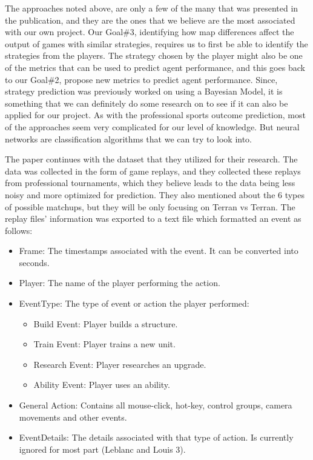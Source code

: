 \documentclass[a4paper,12pt]{report}
\begin{document}
The approaches noted above, are only a few of the many that was presented in the publication, and they are the ones that we believe are the most associated with our own project. Our Goal\#3, identifying how map differences affect the output of games with similar strategies, requires us to first be able to identify the strategies from the players. The strategy chosen by the player might also be one of the metrics that can be used to predict agent performance, and this goes back to our Goal\#2, propose new metrics to predict agent performance. Since, strategy prediction was previously worked on using a Bayesian Model, it is something that we can definitely do some research on to see if it can also be applied for our project. As with the professional sports outcome prediction, most of the approaches seem very complicated for our level of knowledge. But neural networks are classification algorithms that we can try to look into.

The paper continues with the dataset that they utilized for their research. The data was collected in the form of game replays, and they collected these replays from professional tournaments, which they believe leads to the data being less noisy and more optimized for prediction. They also mentioned about the 6 types of possible matchups, but they will be only focusing on Terran vs Terran. The replay files’ information was exported to a text file which formatted an event as follows:

\begin{itemize}[,]
    \setlength\itemsep{-.1cm}
    \item Frame: The timestamps associated with the event. It can be converted into seconds.
    \item Player: The name of the player performing the action.
    \item EventType: The type of event or action the player performed:
    \vspace*{-2mm}
    \begin{itemize}[,]
        \setlength\itemsep{0cm}
        \item Build Event: Player builds a structure.
        \item Train Event: Player trains a new unit.
        \item Research Event: Player researches an upgrade.
        \item Ability Event: Player uses an ability.
    \end{itemize}
    \item General Action: Contains all mouse-click, hot-key, control groups, camera movements and other events.
    \item EventDetails: The details associated with that type of action. Is currently ignored for most part (Leblanc and Louis 3).
\end{itemize}
\end{document}
